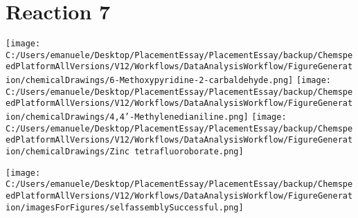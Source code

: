 \documentclass{article}%
\begin{document}
\section*{Reaction 7}%
%
\begin{scheme}[H]%
\begin{minipage}{0.5\textwidth}%
\texttt{[image: C:/Users/emanuele/Desktop/PlacementEssay/PlacementEssay/backup/ChemspeedPlatformAllVersions/V12/Workflows/DataAnalysisWorkflow/FigureGeneration/chemicalDrawings/6-Methoxypyridine-2-carbaldehyde.png]}%
\texttt{[image: C:/Users/emanuele/Desktop/PlacementEssay/PlacementEssay/backup/ChemspeedPlatformAllVersions/V12/Workflows/DataAnalysisWorkflow/FigureGeneration/chemicalDrawings/4,4'-Methylenedianiline.png]}%
\texttt{[image: C:/Users/emanuele/Desktop/PlacementEssay/PlacementEssay/backup/ChemspeedPlatformAllVersions/V12/Workflows/DataAnalysisWorkflow/FigureGeneration/chemicalDrawings/Zinc tetrafluoroborate.png]}%
\end{minipage}%
\begin{minipage}{0.5\textwidth}%
\begin{center}%
\texttt{[image: C:/Users/emanuele/Desktop/PlacementEssay/PlacementEssay/backup/ChemspeedPlatformAllVersions/V12/Workflows/DataAnalysisWorkflow/FigureGeneration/imagesForFigures/selfassemblySuccessful.png]}%
\end{center}%
\end{minipage}%
\caption{Self-assembly of components 6, 17, with Zinc(II) in a 3.0:1.5:1.0 molar ratio in CH$_3$CN at 60\textdegree C for 40h. These are the reagents (starting materials) for reaction 7.}%
\end{scheme}%
\end{document}

